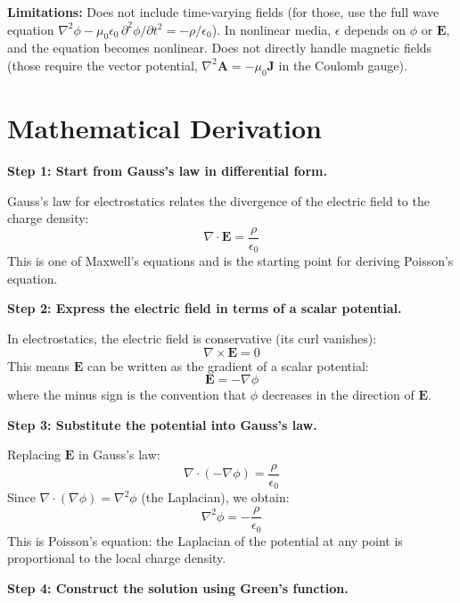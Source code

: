 \textbf{Limitations:} Does not include time-varying fields (for those, use the full wave equation $\nabla^2\phi - \mu_0\epsilon_0\,\partial^2\phi/\partial t^2 = -\rho/\epsilon_0$). In nonlinear media, $\epsilon$ depends on $\phi$ or $\mathbf{E}$, and the equation becomes nonlinear. Does not directly handle magnetic fields (those require the vector potential, $\nabla^2\mathbf{A} = -\mu_0\mathbf{J}$ in the Coulomb gauge).


\section*{Mathematical Derivation}

\textbf{Step 1: Start from Gauss's law in differential form.}

Gauss's law for electrostatics relates the divergence of the electric field to the charge density:
\begin{equation}
\nabla\cdot\mathbf{E} = \frac{\rho}{\epsilon_0}
\end{equation}
This is one of Maxwell's equations and is the starting point for deriving Poisson's equation.

\textbf{Step 2: Express the electric field in terms of a scalar potential.}

In electrostatics, the electric field is conservative (its curl vanishes):
\begin{equation}
\nabla\times\mathbf{E} = 0
\end{equation}
This means $\mathbf{E}$ can be written as the gradient of a scalar potential:
\begin{equation}
\mathbf{E} = -\nabla\phi
\end{equation}
where the minus sign is the convention that $\phi$ decreases in the direction of $\mathbf{E}$.

\textbf{Step 3: Substitute the potential into Gauss's law.}

Replacing $\mathbf{E}$ in Gauss's law:
\begin{equation}
\nabla\cdot(-\nabla\phi) = \frac{\rho}{\epsilon_0}
\end{equation}
Since $\nabla\cdot(\nabla\phi) = \nabla^2\phi$ (the Laplacian), we obtain:
\begin{equation}
\nabla^2\phi = -\frac{\rho}{\epsilon_0}
\end{equation}
This is Poisson's equation: the Laplacian of the potential at any point is proportional to the local charge density.

\textbf{Step 4: Construct the solution using Green's function.}

